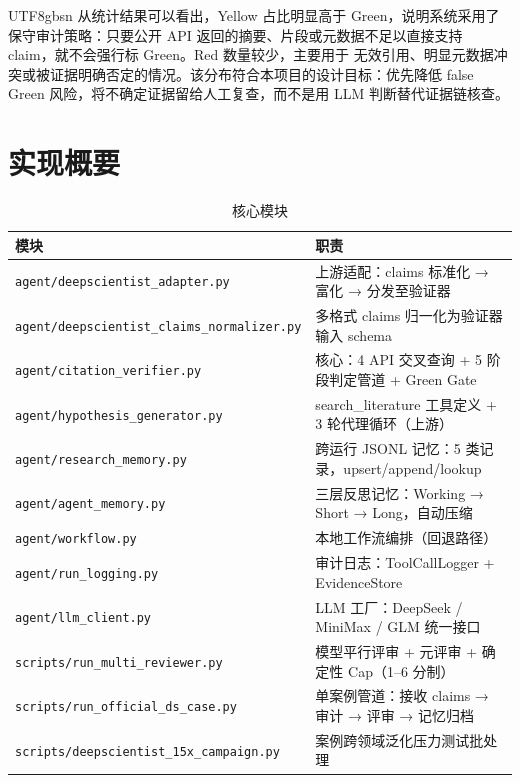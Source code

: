 \documentclass[11pt,a4paper]{article}
\begin{document}
\begin{CJK*}{UTF8}{gbsn}
从统计结果可以看出，Yellow 占比明显高于 Green，说明系统采用了保守审计策略：只要公开 API
返回的摘要、片段或元数据不足以直接支持 claim，就不会强行标 Green。Red 数量较少，主要用于
无效引用、明显元数据冲突或被证据明确否定的情况。该分布符合本项目的设计目标：优先降低
false Green 风险，将不确定证据留给人工复查，而不是用 LLM 判断替代证据链核查。

\section{实现概要}

\begin{table}[htbp]
\centering
\caption{核心模块}
\begin{tabularx}{\textwidth}{@{}l>{\raggedright\arraybackslash}X@{}}
\toprule
\textbf{模块} & \textbf{职责} \\
\midrule
\texttt{agent/deepscientist\_adapter.py} & 上游适配：claims 标准化 → 富化 → 分发至验证器 \\
\texttt{agent/deepscientist\_claims\_normalizer.py} & 多格式 claims 归一化为验证器输入 schema \\
\texttt{agent/citation\_verifier.py} & 核心：4 API 交叉查询 + 5 阶段判定管道 + Green Gate \\
\texttt{agent/hypothesis\_generator.py} & search\_literature 工具定义 + 3 轮代理循环（上游） \\
\texttt{agent/research\_memory.py} & 跨运行 JSONL 记忆：5 类记录，upsert/append/lookup \\
\texttt{agent/agent\_memory.py} & 三层反思记忆：Working → Short → Long，自动压缩 \\
\texttt{agent/workflow.py} & 本地工作流编排（回退路径） \\
\texttt{agent/run\_logging.py} & 审计日志：ToolCallLogger + EvidenceStore \\
\texttt{agent/llm\_client.py} & LLM 工厂：DeepSeek / MiniMax / GLM 统一接口 \\
\texttt{scripts/run\_multi\_reviewer.py} & 4 模型平行评审 + 元评审 + 确定性 Cap（1--6 分制） \\
\texttt{scripts/run\_official\_ds\_case.py} & 单案例管道：接收 claims → 审计 → 评审 → 记忆归档 \\
\texttt{scripts/deepscientist\_15x\_campaign.py} & 15 案例跨领域泛化压力测试批处理 \\
\bottomrule
\end{tabularx}
\end{table}



\end{CJK*}
\end{document}
